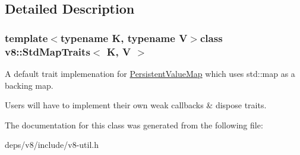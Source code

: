 \subsection{Detailed Description}
\subsubsection*{template$<$typename K, typename V$>$class v8\+::\+Std\+Map\+Traits$<$ K, V $>$}

A default trait implemenation for \hyperlink{classv8_1_1_persistent_value_map}{Persistent\+Value\+Map} which uses std\+::map as a backing map.

Users will have to implement their own weak callbacks \& dispose traits. 

The documentation for this class was generated from the following file\+:\begin{DoxyCompactItemize}
\item 
deps/v8/include/v8-\/util.\+h\end{DoxyCompactItemize}
